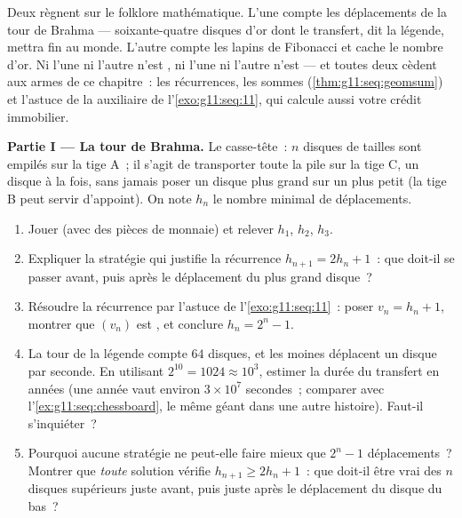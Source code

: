 \begin{problem}
\label{pb:g11:seq:1}
Deux  règnent sur le folklore mathématique. L'une compte les
déplacements de la tour de Brahma --- soixante-quatre disques d'or
dont le transfert, dit la légende, mettra fin au monde. L'autre
compte les lapins de Fibonacci et cache le nombre d'or. Ni l'une ni
l'autre n'est , ni l'une ni l'autre n'est 
--- et toutes deux cèdent aux armes de ce chapitre~: les
récurrences, les sommes  (\cref{thm:g11:seq:geomsum}) et
l'astuce de la  auxiliaire de l'\cref{exo:g11:seq:11}, qui
calcule aussi votre crédit immobilier.

\medskip
\noindent\textbf{Partie I --- La tour de Brahma.}
Le casse-tête~: $n$ disques de tailles  sont empilés sur
la tige A~; il s'agit de transporter toute la pile sur la tige C, un
disque à la fois, sans jamais poser un disque plus grand sur un plus
petit (la tige B peut servir d'appoint). On note $h_n$ le nombre
minimal de déplacements.
\begin{enumerate}
  \item Jouer (avec des pièces de monnaie) et relever $h_1$, $h_2$,
        $h_3$.
  \item Expliquer la stratégie qui justifie la récurrence
        $h_{n+1} = 2h_n + 1$~: que doit-il se passer avant, puis
        après le déplacement du plus grand disque~?
  \item Résoudre la récurrence par l'astuce de
        l'\cref{exo:g11:seq:11}~: poser $v_n = h_n + 1$, montrer que
        $(v_n)$ est , et conclure $h_n = 2^n - 1$.
  \item La tour de la légende compte $64$ disques, et les moines
        déplacent un disque par seconde. En utilisant
        $2^{10} = 1024 \approx 10^3$, estimer la durée du transfert
        en années (une année vaut environ $3 \times 10^7$ secondes~;
        comparer avec l'\cref{ex:g11:seq:chessboard}, le même géant
        dans une autre histoire). Faut-il s'inquiéter~?
  \item Pourquoi aucune stratégie ne peut-elle faire mieux que
        $2^n - 1$ déplacements~? Montrer que \emph{toute} solution
        vérifie $h_{n+1} \geq 2 h_n + 1$~: que doit-il être vrai des
        $n$ disques supérieurs juste avant, puis juste après le
        déplacement du disque du bas~?
\end{enumerate}


\end{problem}
